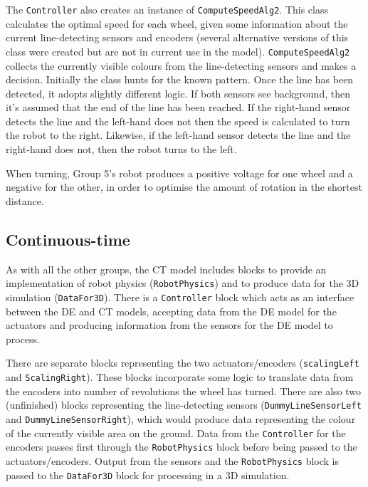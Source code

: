 The \texttt{Controller} also creates an instance of
\texttt{ComputeSpeedAlg2}.  This class calculates the optimal speed
for each wheel, given some information about the current
line-detecting sensors and encoders (several alternative versions of
this class were created but are not in current use in the model).
\texttt{ComputeSpeedAlg2} collects the currently visible colours from
the line-detecting sensors and makes a decision.  Initially the class
hunts for the known pattern.  Once the line has been detected, it
adopts slightly different logic.  If both sensors see background, then
it's assumed that the end of the line has been reached.  If the
right-hand sensor detects the line and the left-hand does not then the
speed is calculated to turn the robot to the right.  Likewise, if the
left-hand sensor detects the line and the right-hand does not, then
the robot turns to the left.

When turning, Group 5's robot produces a positive voltage for one
wheel and a negative for the other, in order to optimise the amount of
rotation in the shortest distance.

\subsection{Continuous-time} 
As with all the other groups, the CT model includes blocks to provide
an implementation of robot physics (\texttt{RobotPhysics}) and to
produce data for the 3D simulation (\texttt{DataFor3D}).  There is a
\texttt{Controller} block which acts as an interface between the DE
and CT models, accepting data from the DE model for the actuators and
producing information from the sensors for the DE model to process.

There are separate blocks representing the two actuators/encoders
(\texttt{scalingLeft} and \texttt{Sca\-ling\-Right}).  These blocks incorporate
some logic to translate data from the encoders into number of
revolutions the wheel has turned.  There are also two (unfinished)
blocks representing the line-detecting sensors
(\texttt{DummyLineSensorLeft} and \texttt{DummyLineSensorRight}),
which would produce data representing the colour of the currently
visible area on the ground.  Data from the \texttt{Controller} for the
encoders passes first through the \texttt{RobotPhysics} block before
being passed to the actuators/encoders.  Output from the sensors and
the \texttt{RobotPhysics} block is passed to the \texttt{DataFor3D}
block for processing in a 3D simulation.







